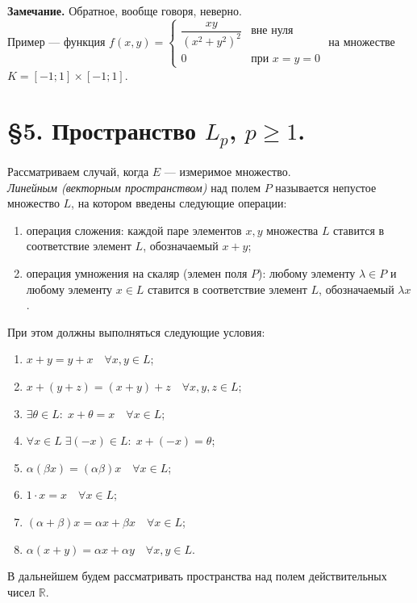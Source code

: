 \documentclass[12pt,a4paper, titlepage]{article}
\begin{document}
\textbf{Замечание.} Обратное, вообще говоря, неверно.\\

Пример --- функция
$
f(x, y) =
\begin{cases}
\dfrac {xy}{(x^2 + y^2)^2} &\text{вне нуля} \\
0 &\text{при $x=y=0$}
\end{cases}
$
на множестве $K = [-1; 1] \times [-1; 1]$.


\section*{\S 5. Пространство $L_p$, $p \geqslant 1$.}

Рассматриваем случай, когда $E$ --- измеримое множество.\\

\textit{Линейным (векторным пространством)} над полем $P$ называется непустое множество $L$, на котором введены следующие операции:
\begin{enumerate}
\item операция сложения: каждой паре элементов $x, y$ множества $L$ ставится в соответствие элемент $L$, обозначаемый $x + y$;
\item операция умножения на скаляр (элемен поля $P$): любому элементу $\lambda \in P$ и любому элементу $x \in L$ ставится в соответствие элемент $L$, обозначаемый $\lambda x$.
\end{enumerate}

При этом должны выполняться следующие условия:
\begin{enumerate}
\item $x + y = y + x \quad \forall x, y \in L$;
\item $x + (y + z) = (x + y) + z \quad \forall x, y, z \in L$;
\item $\exists \theta \in L : \; x + \theta = x \quad \forall x \in L$;
\item $\forall x \in L \; \exists (-x) \in L : \; x + (-x) = \theta$;
\item $\alpha (\beta x) = (\alpha \beta) x \quad \forall x \in L$;
\item $1 \cdot x = x \quad \forall x \in L$;
\item $(\alpha + \beta) x = \alpha x + \beta x \quad \forall x \in L$;
\item $\alpha (x + y) = \alpha x + \alpha y \quad \forall x, y \in L$.
\end{enumerate}

В дальнейшем будем рассматривать пространства над полем действительных чисел $\mathbb{R}$.\\
\end{document}

